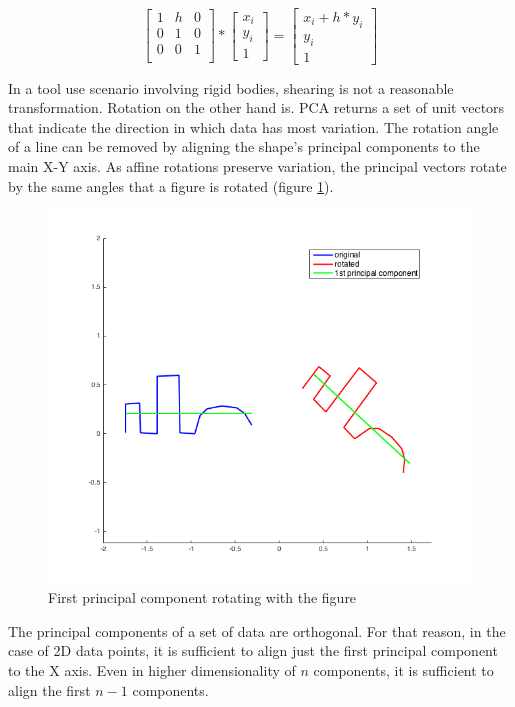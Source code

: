 \documentclass[
    floatsintext
]{article}
\begin{document}
\begin{equation}
  \begin{bmatrix}
    1 & h & 0 \\
    0 & 1 & 0 \\
    0 & 0 & 1   \\ 
  \end{bmatrix} 
  *
  \begin{bmatrix}
    x_i \\ y_i \\ 1
  \end{bmatrix} 
  = 
  \begin{bmatrix}
    x_i + h * y_i \\ y_i \\ 1  
  \end{bmatrix}
  \label{eq:shear}
\end{equation}

In a tool use scenario involving rigid bodies, shearing is not a reasonable transformation. Rotation on the other hand is. 
PCA returns a set of unit vectors that indicate the direction in which data has most variation. 
The rotation angle of a line can be removed by aligning the shape's principal components to the main X-Y axis.    
As affine rotations preserve variation, the principal vectors rotate by the same angles that a figure is rotated (figure \ref{fig:pca_rotation}).  

\begin{figure}[h]
  \centering
  \includegraphics[width=.5\textwidth]{./figures/pca_rotation.png}
  \caption{First principal component rotating with the figure}
  \label{fig:pca_rotation}
\end{figure}  

The principal components of a set of data are orthogonal. 
For that reason, in the case of 2D data points, it is sufficient to align just the first principal component to the X axis.
Even in higher dimensionality of $n$ components, it is sufficient to align the first $n-1$ components.
\end{document}
